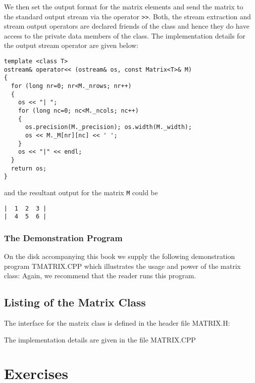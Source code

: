 We then set the output format for the matrix elements and send the
matrix to the standard output stream via the operator \verb+>>+.
Both, the stream extraction and stream output operators are declared
friends of the class and hence they do have access to the private
data members of the class. The implementation details for the output 
stream operator are given below:
{\footnotesize \begin{verbatim}
template <class T>
ostream& operator<< (ostream& os, const Matrix<T>& M)
{
  for (long nr=0; nr<M._nrows; nr++)
  {
    os << "| ";
    for (long nc=0; nc<M._ncols; nc++)
    {
      os.precision(M._precision); os.width(M._width);
      os << M._M[nr][nc] << ' ';
    }
    os << "|" << endl;
  }
  return os;
}
\end{verbatim}}
and the resultant output for the matrix \verb+M+ could be
{\footnotesize \begin{verbatim}
|  1  2  3 |
|  4  5  6 |
\end{verbatim}}


\subsubsection{The Demonstration Program}

On the disk accompanying this book we supply the following demonstration 
program TMATRIX.CPP which illustrates the usage and power of the matrix
class:
\noindent
{\footnotesize  }
\noindent
Again, we recommend that the reader runs this program.


\subsection{Listing of the Matrix Class \label{mat_listing}}

The interface for the matrix class is defined in the header file
MATRIX.H:
{\footnotesize  }

The implementation details are given in the file MATRIX.CPP
{\footnotesize  }


\section{Exercises}

